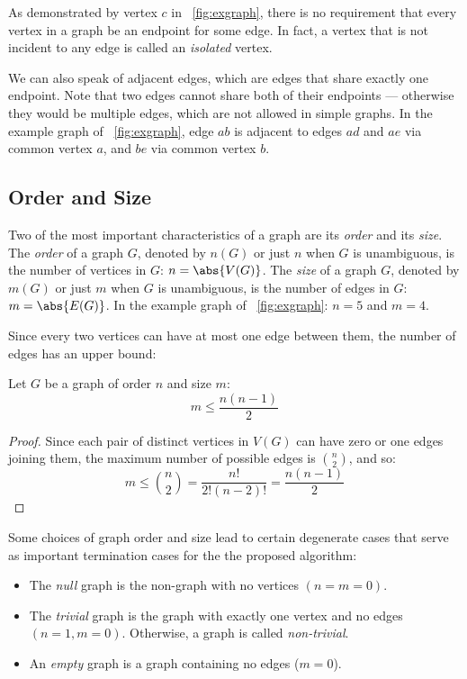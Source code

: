 As demonstrated by vertex \(c\) in \figurename~\ref{fig:exgraph}, there is no requirement that every vertex in a
graph be an endpoint for some edge.  In fact, a vertex that is not incident to any edge is called an
\emph{isolated} vertex.

We can also speak of adjacent edges, which are edges that share exactly one endpoint.  Note that two edges cannot
share both of their endpoints --- otherwise they would be multiple edges, which are not allowed in simple graphs.
In the example graph of \figurename~\ref{fig:exgraph}, edge \(ab\) is adjacent to edges \(ad\) and \(ae\) via
common vertex \(a\), and \(be\) via common vertex \(b\).

\subsection{Order and Size}\label{sec:sub:ordersize}

Two of the most important characteristics of a graph are its \emph{order} and its \emph{size}.  The \emph{order} of
a graph \(G\), denoted by \(n(G)\) or just \(n\) when \(G\) is unambiguous, is the number of vertices in \(G\):
\(n=\abs{V(G)}\).  The \emph{size} of a graph \(G\), denoted by \(m(G)\) or just \(m\) when \(G\) is unambiguous,
is the number of edges in \(G\): \(m=\abs{E(G)}\).  In the example graph of \figurename~\ref{fig:exgraph}: \(n=5\)
and \(m=4\).

Since every two vertices can have at most one edge between them, the number of edges has an upper bound:

\begin{theorem}
  Let \(G\) be a graph of order \(n\) and size \(m\):
  \[m\le\frac{n(n-1)}{2}\]
\end{theorem}

\begin{proof}
  Since each pair of distinct vertices in \(V(G)\) can have zero or one edges joining them, the maximum number of
  possible edges is \(\binom{n}{2}\), and so:
  \[m\le\binom{n}{2}=\frac{n!}{2!(n-2)!}=\frac{n(n-1)}{2}\]
\end{proof}

Some choices of graph order and size lead to certain degenerate cases that serve as important termination cases for
the the proposed algorithm:
\begin{itemize}
\item The \emph{null} graph is the non-graph with no vertices \((n=m=0)\).
\item The \emph{trivial} graph is the graph with exactly one vertex and no edges \((n=1,m=0)\).  Otherwise, a graph
  is called \emph{non-trivial}.
\item An \emph{empty} graph is a graph containing no edges (\(m=0\)).
\end{itemize}

